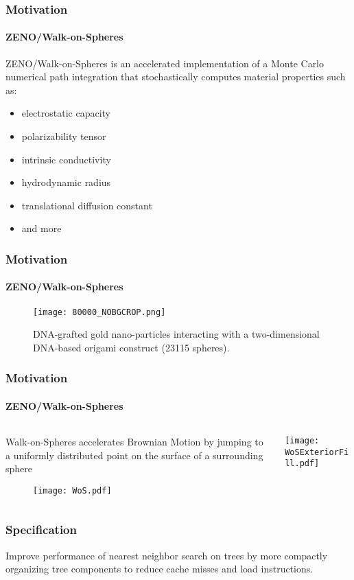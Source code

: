 \begin{frame}
  \frametitle{Motivation}
  \framesubtitle{ZENO/Walk-on-Spheres}

  {\color{white}\Large%
  ZENO/Walk-on-Spheres is an accelerated implementation of a Monte Carlo
    numerical path integration that stochastically computes material properties
    such as:
  }
  \begin{itemize}
      \large%
    \item electrostatic capacity
    \item polarizability tensor
    \item intrinsic conductivity 
    \item hydrodynamic radius
    \item translational diffusion constant
    \item and more
  \end{itemize}
\end{frame}

\begin{frame}
  \frametitle{Motivation}
  \framesubtitle{ZENO/Walk-on-Spheres}

  \begin{figure}
    \centering
    \texttt{[image: 80000\_NOBGCROP.png]}
    \caption{DNA-grafted gold nano-particles interacting with a 
    two-dimensional DNA-based origami construct (23115 spheres).}
    \label{fig:80000}
  \end{figure}
\end{frame}


\begin{frame}
  \frametitle{Motivation}
  \framesubtitle{ZENO/Walk-on-Spheres}

  \begin{columns}[T]
    \begin{column}{.5\textwidth}
      \begin{block}{}%
        {\color{white} Walk-on-Spheres accelerates Brownian Motion by jumping %
          to a uniformly distributed point on the surface of a surrounding sphere}
      \end{block}
      \vspace{-1cm}%
      \begin{block}{}%
        \begin{figure}
          \centering
          \texttt{[image: WoS.pdf]}
        \end{figure}
      \end{block}
    \end{column}
    \begin{column}{.5\textwidth}
      \begin{block}{}%
        \texttt{[image: WoSExteriorFill.pdf]}
      \end{block}
    \end{column}
  \end{columns}
\end{frame}

\begin{frame}
  \frametitle{Specification}

  {\color{white}
  Improve performance of nearest neighbor search on \kd trees by more compactly organizing tree components
  to reduce cache misses and load instructions.}

\end{frame}
